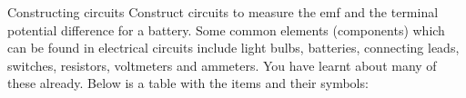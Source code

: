 \begin{activity}{Constructing circuits}
Construct circuits to measure the emf and the terminal potential difference for a battery.
Some common elements (components) which can be found in electrical circuits include light bulbs, batteries, connecting leads, switches, resistors, voltmeters and ammeters. You have learnt about many of these already. Below is a table with the items and their symbols:


\end{activity}
